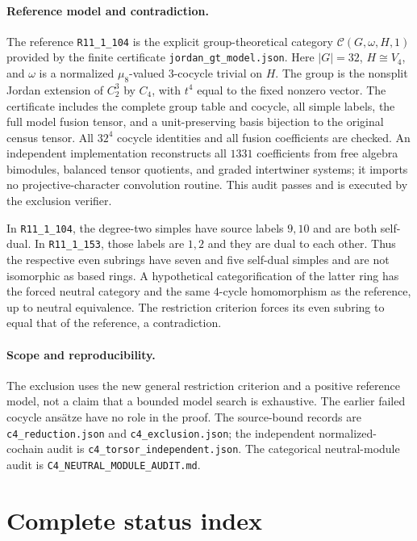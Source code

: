 \documentclass[11pt,a4paper]{article}
\begin{document}
\paragraph{Reference model and contradiction.}
The reference \texttt{R11\_1\_104} is the explicit group-theoretical
category $\mathcal C(G,\omega,H,1)$ provided by the finite certificate
\texttt{jordan\_gt\_model.json}. Here $|G|=32$, $H\cong V_4$, and
$\omega$ is a normalized $\mu_8$-valued $3$-cocycle trivial on $H$.
The group is the nonsplit Jordan extension of $C_2^3$ by $C_4$,
with $t^4$ equal to the fixed nonzero vector.
The certificate includes the complete group table and cocycle,
all simple labels, the full model fusion tensor, and a unit-preserving
basis bijection to the original census tensor. All $32^4$ cocycle
identities and all fusion coefficients are checked. An independent
implementation reconstructs all $1331$ coefficients from free algebra
bimodules, balanced tensor quotients, and graded intertwiner systems;
it imports no projective-character convolution routine. This audit
passes and is executed by the exclusion verifier.

In \texttt{R11\_1\_104}, the degree-two simples have source labels
$9,10$ and are both self-dual. In \texttt{R11\_1\_153}, those labels
are $1,2$ and they are dual to each other. Thus the respective even
subrings have seven and five self-dual simples and are not isomorphic
as based rings. A hypothetical categorification of the latter ring
has the forced neutral category and the same $4$-cycle homomorphism
as the reference, up to neutral equivalence. The restriction criterion
forces its even subring to equal that of the reference, a contradiction.

\paragraph{Scope and reproducibility.}
The exclusion uses the new general restriction criterion and a positive
reference model, not a claim that a bounded model search is exhaustive.
The earlier failed cocycle ans\"atze have no role in the proof.
The source-bound records are \texttt{c4\_reduction.json} and
\texttt{c4\_exclusion.json}; the independent normalized-cochain audit is
\texttt{c4\_torsor\_independent.json}. The categorical neutral-module
audit is \texttt{C4\_NEUTRAL\_MODULE\_AUDIT.md}.

\section{Complete status index}
\end{document}
